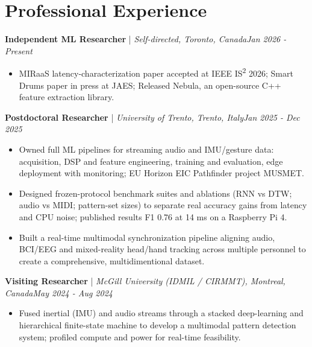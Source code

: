 \documentclass[11pt]{article}
\newenvironment{cvrole}[5]{%
  \par\noindent\textbf{\large #1} | \textit{\small #2, #3}\hfill \textit{\small #4 - #5}\par
  \begin{itemize}[leftmargin=2em, itemsep=-0.3em, topsep=-0.5em]%
}{%
  \end{itemize}\par\noindent\mbox{}\par\vspace{0.1em}%
}
\begin{document}
\newpage

\section*{Professional Experience}

\begin{cvrole}{Independent ML Researcher}{Self-directed}{Toronto, Canada}{Jan 2026}{Present}
    \item MIRaaS latency-characterization paper accepted at IEEE IS\textsuperscript{2} 2026; Smart Drums paper in press at JAES; Released Nebula, an open-source C++ feature extraction library.
\end{cvrole}

\begin{cvrole}{Postdoctoral Researcher}{University of Trento}{Trento, Italy}{Jan 2025}{Dec 2025}
    \item Owned full ML pipelines for streaming audio and IMU/gesture data: acquisition, DSP and feature engineering, training and evaluation, edge deployment with monitoring; EU Horizon EIC Pathfinder project MUSMET.
    \item Designed frozen-protocol benchmark suites and ablations (RNN vs DTW; audio vs MIDI; pattern-set sizes) to separate real accuracy gains from latency and CPU noise; published results F1 0.76 at 14 ms on a Raspberry Pi 4.
    \item Built a real-time multimodal synchronization pipeline aligning audio, BCI/EEG and mixed-reality head/hand tracking across multiple personnel to create a comprehensive, multidimentional dataset.  
\end{cvrole}

\begin{cvrole}{Visiting Researcher}{McGill University (IDMIL / CIRMMT)}{Montreal, Canada}{May 2024}{Aug 2024}
    \item Fused inertial (IMU) and audio streams through a stacked deep-learning and hierarchical finite-state machine to develop a multimodal pattern detection system; profiled compute and power for real-time feasibility.
\end{cvrole}
\end{document}
